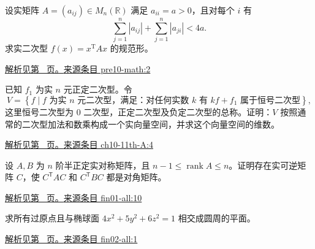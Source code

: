 \documentclass[UTF8,12pt,a4paper,fontset=fandol]{ctexart}
\begin{document}
\begin{example}\label{ex:pre10-math:2}

设实矩阵 $A=(a_{ij})\in M_n(\mathbb R)$ 满足 $a_{ii}=a>0$，且对每个 $i$ 有
\[
\sum_{j=1}^n|a_{ij}|+\sum_{j=1}^n|a_{ji}|<4a.
\]
求实二次型 $f(x)=x^{\mathrm T}Ax$ 的规范形。

\par\hyperref[ans:pre10-math:2]{解析见第~\pageref{ans:pre10-math:2} 页。}\quad\href{https://github.com/lzxcr/cmc-mathematics/blob/64916fa1fdbc3e444a652eca204d5669058ee321/src/problems/preliminary/10/02.md}{来源条目 pre10-math:2}

\end{example}

\begin{example}\label{ex:ch10-11th-A:4}

已知 $f_{1}$ 为实 $n$ 元正定二次型。令
\[
V=\left\{f\mid f\text{ 为实 }n\text{ 元二次型，满足：对任何实数 }k\text{ 有 }kf+f_{1}\text{ 属于恒号二次型}\right\},
\]
这里恒号二次型为 0 二次型，正定二次型及负定二次型的总称。证明：$V$ 按照通常的二次型加法和数乘构成一个实向量空间，并求这个向量空间的维数。

\par\hyperref[ans:ch10-11th-A:4]{解析见第~\pageref{ans:ch10-11th-A:4} 页。}\quad\href{https://github.com/lzxcr/cmc-mathematics/blob/64916fa1fdbc3e444a652eca204d5669058ee321/src/problems/preliminary/11/04.md}{来源条目 ch10-11th-A:4}

\end{example}

\begin{example}\label{ex:fin01-all:10}

设 $A,B$ 为 $n$ 阶半正定实对称矩阵，且 $n-1\le\operatorname{rank}A\le n$。证明存在实可逆矩阵 $C$，使 $C^{\mathsf T}AC$ 和 $C^{\mathsf T}BC$ 都是对角矩阵。

\par\hyperref[ans:fin01-all:10]{解析见第~\pageref{ans:fin01-all:10} 页。}\quad\href{https://github.com/lzxcr/cmc-mathematics/blob/64916fa1fdbc3e444a652eca204d5669058ee321/src/problems/finals/01/10.md}{来源条目 fin01-all:10}

\end{example}

\begin{example}\label{ex:fin02-all:1}

求所有过原点且与椭球面 $4x^2+5y^2+6z^2=1$ 相交成圆周的平面。

\par\hyperref[ans:fin02-all:1]{解析见第~\pageref{ans:fin02-all:1} 页。}\quad\href{https://github.com/lzxcr/cmc-mathematics/blob/64916fa1fdbc3e444a652eca204d5669058ee321/src/problems/finals/02/01.md}{来源条目 fin02-all:1}

\end{example}
\end{document}
